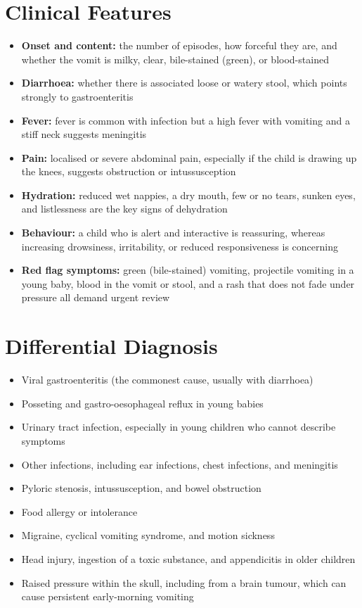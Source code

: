 \section*{Clinical Features}
\begin{itemize}
    \item \textbf{Onset and content:} the number of episodes, how forceful they are, and whether the vomit is milky, clear, bile-stained (green), or blood-stained
    \item \textbf{Diarrhoea:} whether there is associated loose or watery stool, which points strongly to gastroenteritis
    \item \textbf{Fever:} fever is common with infection but a high fever with vomiting and a stiff neck suggests meningitis
    \item \textbf{Pain:} localised or severe abdominal pain, especially if the child is drawing up the knees, suggests obstruction or intussusception
    \item \textbf{Hydration:} reduced wet nappies, a dry mouth, few or no tears, sunken eyes, and listlessness are the key signs of dehydration
    \item \textbf{Behaviour:} a child who is alert and interactive is reassuring, whereas increasing drowsiness, irritability, or reduced responsiveness is concerning
    \item \textbf{Red flag symptoms:} green (bile-stained) vomiting, projectile vomiting in a young baby, blood in the vomit or stool, and a rash that does not fade under pressure all demand urgent review
\end{itemize}

\section*{Differential Diagnosis}
\begin{itemize}
    \item Viral gastroenteritis (the commonest cause, usually with diarrhoea)
    \item Posseting and gastro-oesophageal reflux in young babies
    \item Urinary tract infection, especially in young children who cannot describe symptoms
    \item Other infections, including ear infections, chest infections, and meningitis
    \item Pyloric stenosis, intussusception, and bowel obstruction
    \item Food allergy or intolerance
    \item Migraine, cyclical vomiting syndrome, and motion sickness
    \item Head injury, ingestion of a toxic substance, and appendicitis in older children
    \item Raised pressure within the skull, including from a brain tumour, which can cause persistent early-morning vomiting
\end{itemize}

